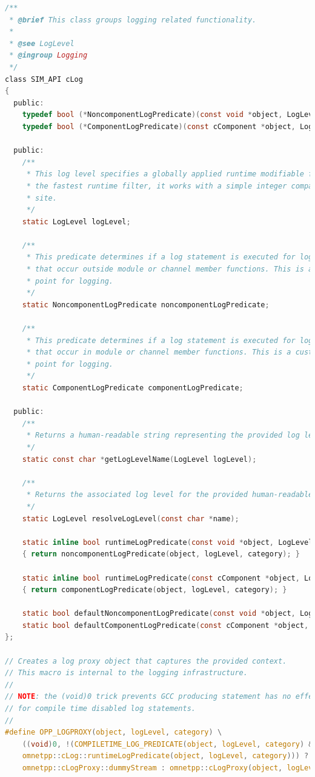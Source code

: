 \begin{lstlisting}[language=c]
/**
 * @brief This class groups logging related functionality.
 *
 * @see LogLevel
 * @ingroup Logging
 */
class SIM_API cLog
{
  public:
    typedef bool (*NoncomponentLogPredicate)(const void *object, LogLevel logLevel, const char *category);
    typedef bool (*ComponentLogPredicate)(const cComponent *object, LogLevel logLevel, const char *category);

  public:
    /**
     * This log level specifies a globally applied runtime modifiable filter. This is
     * the fastest runtime filter, it works with a simple integer comparison at the call
     * site.
     */
    static LogLevel logLevel;

    /**
     * This predicate determines if a log statement is executed for log statements
     * that occur outside module or channel member functions. This is a customization
     * point for logging.
     */
    static NoncomponentLogPredicate noncomponentLogPredicate;

    /**
     * This predicate determines if a log statement is executed for log statements
     * that occur in module or channel member functions. This is a customization
     * point for logging.
     */
    static ComponentLogPredicate componentLogPredicate;

  public:
    /**
     * Returns a human-readable string representing the provided log level.
     */
    static const char *getLogLevelName(LogLevel logLevel);

    /**
     * Returns the associated log level for the provided human-readable string.
     */
    static LogLevel resolveLogLevel(const char *name);

    static inline bool runtimeLogPredicate(const void *object, LogLevel logLevel, const char *category)
    { return noncomponentLogPredicate(object, logLevel, category); }

    static inline bool runtimeLogPredicate(const cComponent *object, LogLevel logLevel, const char *category)
    { return componentLogPredicate(object, logLevel, category); }

    static bool defaultNoncomponentLogPredicate(const void *object, LogLevel logLevel, const char *category);
    static bool defaultComponentLogPredicate(const cComponent *object, LogLevel logLevel, const char *category);
};

// Creates a log proxy object that captures the provided context.
// This macro is internal to the logging infrastructure.
//
// NOTE: the (void)0 trick prevents GCC producing statement has no effect warnings
// for compile time disabled log statements.
//
#define OPP_LOGPROXY(object, logLevel, category) \
    ((void)0, !(COMPILETIME_LOG_PREDICATE(object, logLevel, category) && \
    omnetpp::cLog::runtimeLogPredicate(object, logLevel, category))) ? \
    omnetpp::cLogProxy::dummyStream : omnetpp::cLogProxy(object, logLevel, category, __FILE__, __LINE__, __FUNCTION__)



\end{lstlisting}
